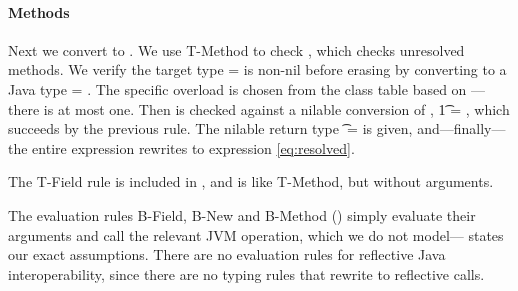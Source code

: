 \paragraph{Methods} Next we convert {\methodexp {\getparent{}} {\newstaticexp {\String} {\File{}} {\File{}} {}} {}}
to
{\methodstaticexp {\File} {} {\String} {\getparent{}} {\newstaticexp {\String} {\File{}} {\File{}} {}} {}}.
We use T-Method to check {\methodexp {\getparent{}} {\newstaticexp {\String} {\File{}} {\File{}} {}} {}}, 
which checks unresolved methods.
We verify the target type \s{} = \File is non-nil before erasing \Nil
by converting to a Java type  = \File.
The specific overload is chosen from the class table based on ---there is at most one.
Then {\newstaticexp {\String} {\File{}} {\File{}} {}}
is checked against a nilable conversion of , \t{1} = \Union{\Nil}{\File},
which succeeds by the previous rule.
The nilable return type \t{} = \Union{\Nil}{\String} is given, and---finally---the 
entire expression rewrites to expression \ref{eq:resolved}.
%

The T-Field rule is included in , and is like T-Method, but without arguments.

The evaluation rules B-Field, B-New and B-Method () simply evaluate their
arguments and call the relevant JVM operation, which we do not model---
states our exact assumptions.
There are no evaluation rules for reflective Java interoperability, since there are no typing
rules that rewrite to reflective calls.



